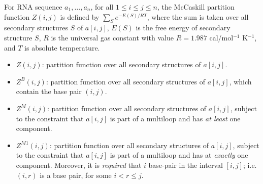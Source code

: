 For RNA sequence
$a_1,\ldots,a_n$, for all $1 \leq i \leq j \leq n$, the
McCaskill partition function  $Z(i,j)$ is defined by
$\sum_S e^{-E(S)/RT}$, where
the sum is taken over all secondary structures $S$ of $a[i,j]$,
$E(S)$ is the free energy of secondary structure $S$,
$R$ is the universal gas constant with value
$R=1.987$ cal/mol$^{-1}$ K$^{-1}$, and $T$ is absolute temperature.

\begin{definition}
\label{def:partitionFunctionDefMcCaskill} \hfill\break
\begin{itemize}
\item
$Z(i,j)$: partition function over all secondary structures of
   $a[i,j]$.
\item
$Z^B(i,j)$:
 partition function over all secondary structures of
   $a[i,j]$, which contain the base pair $(i,j)$.
\item
$Z^M(i,j)$:
 partition function over all secondary structures of
   $a[i,j]$, subject to the constraint that
   $a[i,j]$ is part of a multiloop and has {\em at least} one component.
\item
$Z^{M1}(i,j)$:
 partition function over all secondary structures of
  $a[i,j]$, subject to the constraint that
   $a[i,j]$ is part of a multiloop and has at {\em exactly}
   one component. Moreover, it is {\em required} that $i$ base-pair
   in the interval $[i,j]$; i.e. $(i,r)$ is a base pair, for some
   $i<r\leq j$.
\end{itemize}
\end{definition}


